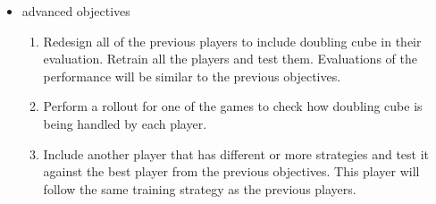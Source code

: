\begin{itemize}
\item advanced objectives
\begin{enumerate}
\item Redesign all of the previous players to include doubling cube in their evaluation. Retrain all the players and test them. Evaluations of the performance will be similar to the previous objectives. 
\item Perform a rollout for one of the games to check how doubling cube is being handled by each player.
\item Include another player that has different or more strategies and test it against the best player from the previous objectives. This player will follow the same training strategy as the previous players.
\end{enumerate}

\end{itemize}